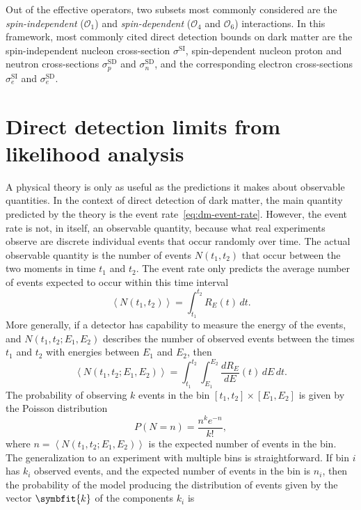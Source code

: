 \documentclass[b5paper, 10pt, twoside]{book}
\renewcommand{\vec}[1]{\symbfit{#1}}
\newcommand{\der}[2]{\frac{d#1}{d#2}}
\newcommand{\difd}{\,d}
\newcommand{\mean}[1]{\left\langle#1\right\rangle}
\begin{document}
Out of the effective operators, two subsets most commonly considered are the \emph{spin-independent} ($\mathcal{O_1}$) and \emph{spin-dependent} ($\mathcal{O}_4$ and $\mathcal{O}_6$) interactions. In this framework, most commonly cited direct detection bounds on dark matter are the spin-independent nucleon cross-section $\sigma^\text{SI}$, spin-dependent nucleon proton and neutron cross-sections $\sigma_p^\text{SD}$ and $\sigma_n^\text{SD}$, and the corresponding electron cross-sections $\sigma_e^\text{SI}$ and $\sigma_e^\text{SD}$.

\section{Direct detection limits from likelihood analysis}

A physical theory is only as useful as the predictions it makes about observable quantities. In the context of direct detection of dark matter, the main quantity predicted by the theory is the event rate~\eqref{eq:dm-event-rate}. However, the event rate is not, in itself, an observable quantity, because what real experiments observe are discrete individual events that occur randomly over time. The actual observable quantity is the number of events $N(t_1,t_2)$ that occur between the two moments in time $t_1$ and $t_2$. The event rate only predicts the average number of events expected to occur within this time interval
\begin{equation}
    \mean{N(t_1,t_2)}=\int_{t_1}^{t_2}R_E(t)\difd t.
\end{equation}
More generally, if a detector has capability to measure the energy of the events, and $N(t_1,t_2;E_1,E_2)$ describes the number of observed events between the times $t_1$ and $t_2$ with energies between $E_1$ and $E_2$, then
\begin{equation}
    \mean{N(t_1,t_2;E_1,E_2)}=\int_{t_1}^{t_2}\int_{E_1}^{E_2}\der{R_E}{E}(t)\difd E\difd t.
\end{equation}
The probability of observing $k$ events in the bin $[t_1,t_2]\times[E_1,E_2]$ is given by the Poisson distribution
\begin{equation}
    P(N=n)=\frac{n^ke^{-n}}{k!},
\end{equation}
where $n=\mean{N(t_1,t_2;E_1,E_2)}$ is the expected number of events in the bin. The generalization to an experiment with multiple bins is straightforward. If bin $i$ has $k_i$ observed events, and the expected number of events in the bin is $n_i$, then the probability of the model producing the distribution of events given by the vector $\vec{k}$ of the components $k_i$ is
\end{document}
